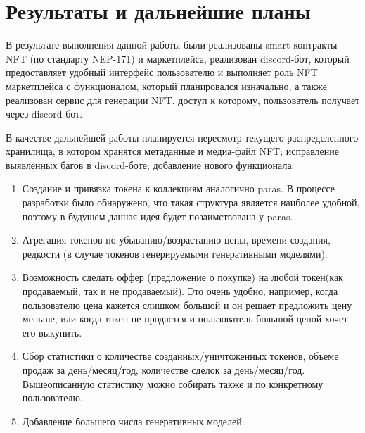 \section{Результаты и дальнейшие планы}
\label{section.output}
В результате выполнения данной работы были реализованы smart-контракты NFT (по стандарту NEP-171) и маркетплейса, реализован discord-бот, который предоставляет удобный интерфейс пользователю и выполняет роль NFT маркетплейса с функционалом, который планировался изначально, а также реализован сервис для генерации NFT, доступ к которому, пользователь получает через discord-бот.

В качестве дальнейшей работы планируется пересмотр текущего распределенного хранилища, в котором хранятся метаданные и медиа-файл NFT; исправление выявленных багов в discord-боте; добавление нового функционала:
\begin{enumerate}
    \item Создание и привязка токена к коллекциям аналогично paras. В процессе разработки было обнаружено, что такая структура является наиболее удобной, поэтому в будущем данная идея будет позаимствована у paras.
    \item Агрегация токенов по убыванию/возрастанию цены, времени создания, редкости (в случае токенов генерируемыми генеративными моделями).
    \item Возможность сделать оффер (предложение о покупке) на любой токен(как продаваемый, так и не продаваемый). Это очень удобно, например, когда пользователю цена кажется слишком большой и он решает предложить цену меньше, или когда токен не продается и пользователь большой ценой хочет его выкупить.
    \item Сбор статистики о количестве созданных/уничтоженных токенов, объеме продаж за день/месяц/год, количестве сделок за день/месяц/год. Вышеописанную статистику можно собирать также и по конкретному пользователю.
    \item Добавление большего числа генеративных моделей.
\end{enumerate}

\newpage
